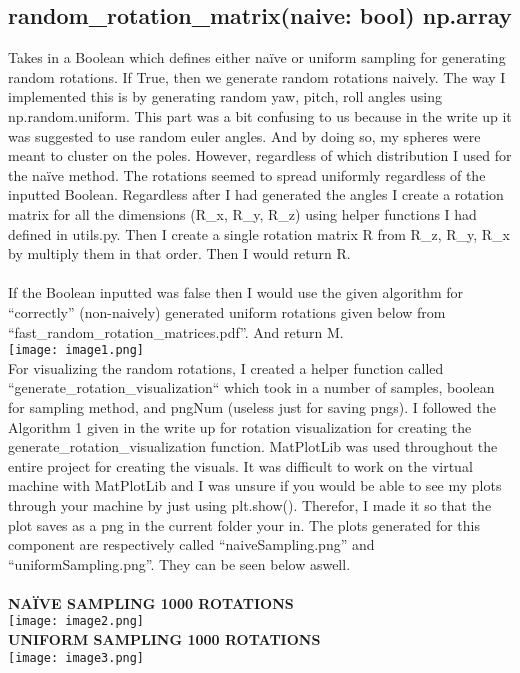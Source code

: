 \documentclass[12pt]{article}
\begin{document}
\subsection*{random\_rotation\_matrix(naive: bool) \rightarrow{} np.array}
Takes in a Boolean which defines either naïve or uniform sampling for generating random rotations. If True, then we generate random rotations naively. The way I implemented this is by generating random yaw, pitch, roll angles using np.random.uniform. This part was a bit confusing to us because in the write up it was suggested to use random euler angles. And by doing so, my spheres were meant to cluster on the poles. However, regardless of which distribution I used for the naïve method. The rotations seemed to spread uniformly regardless of the inputted Boolean. Regardless after I had generated the angles I create a rotation matrix for all the dimensions (R\_x, R\_y, R\_z) using helper functions I had defined in utils.py. Then I create a single rotation matrix R from R\_z, R\_y, R\_x by multiply them in that order. Then I would return R. 
\\ \\
If the Boolean inputted was false then I would use the given algorithm for “correctly” (non-naively) generated uniform rotations given below from “fast\_random\_rotation\_matrices.pdf”. And return M.
\\
\texttt{[image: image1.png]}
\\
For visualizing the random rotations, I created a helper function called “generate\_rotation\_visualization“ which took in a number of samples, boolean for sampling method, and pngNum (useless just for saving pngs). I followed the Algorithm 1 given in the write up for rotation visualization for creating the generate\_rotation\_visualization function. MatPlotLib was used throughout the entire project for creating the visuals. It was difficult to work on the virtual machine with MatPlotLib and I was unsure if you would be able to see my plots through your machine by just using plt.show(). Therefor, I made it so that the plot saves as a png in the current folder your in. The plots generated for this component are respectively called “naiveSampling.png” and “uniformSampling.png”. They can be seen below aswell.
\\ \\
\textbf{NAÏVE SAMPLING 1000 ROTATIONS}
\\
\texttt{[image: image2.png]}
\\
\textbf{UNIFORM SAMPLING 1000 ROTATIONS}
\\
\texttt{[image: image3.png]}
\\ \\
\end{document}
